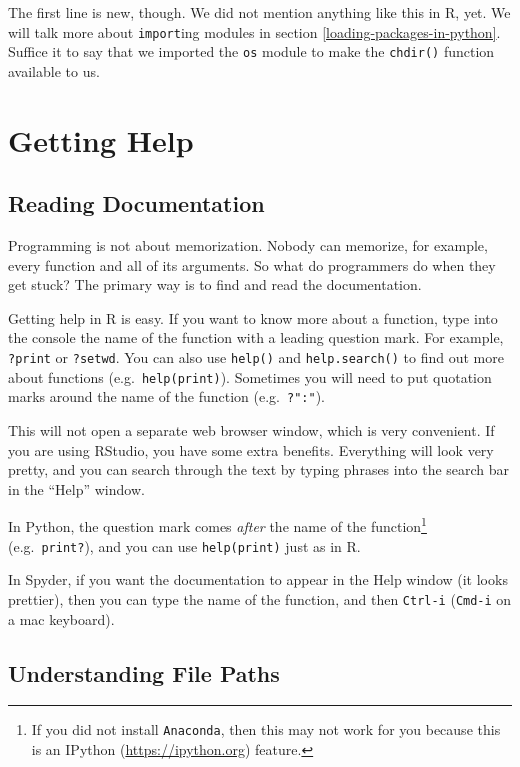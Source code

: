 \documentclass[
  12pt,
  krantz2]{krantz}
\begin{document}
The first line is new, though. We did not mention anything like this in R, yet. We will talk more about \texttt{import}ing modules in section \ref{loading-packages-in-python}. Suffice it to say that we imported the \texttt{os} module to make the \texttt{chdir()} function available to us.

\hypertarget{getting-help}{%
\section{Getting Help}\label{getting-help}}

\hypertarget{reading-documentation}{%
\subsection{Reading Documentation}\label{reading-documentation}}

Programming is not about memorization. Nobody can memorize, for example, every function and all of its arguments. So what do programmers do when they get stuck? The primary way is to find and read the documentation.

Getting help in R is easy. If you want to know more about a function, type into the console the name of the function with a leading question mark. For example, \texttt{?print} or \texttt{?setwd}. You can also use \texttt{help()} and \texttt{help.search()} to find out more about functions (e.g.~\texttt{help(print)}). Sometimes you will need to put quotation marks around the name of the function (e.g.~\texttt{?":"}).

This will not open a separate web browser window, which is very convenient. If you are using RStudio, you have some extra benefits. Everything will look very pretty, and you can search through the text by typing phrases into the search bar in the ``Help'' window.

In Python, the question mark comes \emph{after} the name of the function\footnote{If you did not install \texttt{Anaconda}, then this may not work for you because this is an IPython (\url{https://ipython.org}) feature.} (e.g.~\texttt{print?}), and you can use \texttt{help(print)} just as in R.

In Spyder, if you want the documentation to appear in the Help window (it looks prettier), then you can type the name of the function, and then \texttt{Ctrl-i} (\texttt{Cmd-i} on a mac keyboard).

\hypertarget{understanding-file-paths}{%
\subsection{Understanding File Paths}\label{understanding-file-paths}}
\end{document}
